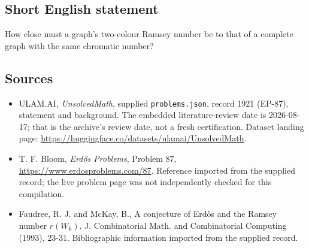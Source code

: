 \documentclass[11pt,a4paper]{article}
\begin{document}
\subsection{Short English statement}

How close must a graph's two-colour Ramsey number be to that of a complete graph with the same chromatic number?

\subsection{Sources}

{\small

\begin{itemize}

\item[\hypertarget{source:1921:1}{S1}] ULAM.AI, \emph{UnsolvedMath}, supplied \texttt{problems.json}, record 1921 (EP-87), statement and background. The embedded literature-review date is 2026-08-17; that is the archive’s review date, not a fresh certification. Dataset landing page: \url{https://huggingface.co/datasets/ulamai/UnsolvedMath}.

\item[\hypertarget{source:1921:2}{S2}] T. F. Bloom, \emph{Erdős Problems}, Problem 87, \url{https://www.erdosproblems.com/87}. Reference imported from the supplied record; the live problem page was not independently checked for this compilation.

\item[\hypertarget{source:1921:3}{S3}] Faudree, R. J. and McKay, B., A conjecture of Erd\H{o}s and the Ramsey number $r(W_6)$. J. Combinatorial Math. and Combinatorial Computing (1993), 23-31. Bibliographic information imported from the supplied record.

\end{itemize}

}

\label{end:1921}
\end{document}
